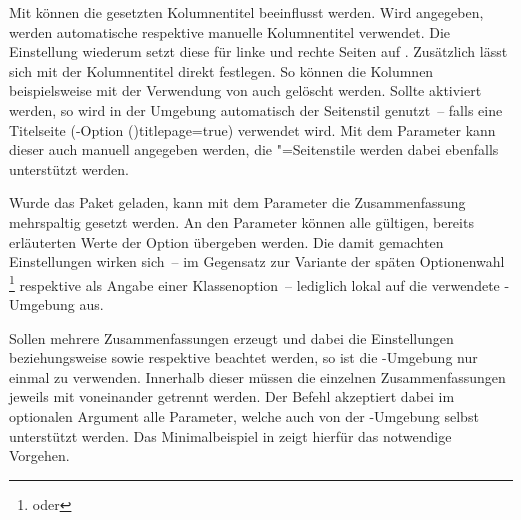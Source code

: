 \begin{DeclareEntity*}{}
\begin{DeclareEntity*}{}
\begin{DeclareEntity*}{}
\begin{Declaration}
\begin{Declaration}
\begin{Declaration}
\begin{Declaration}
\begin{Declaration}
\begin{Declaration}
\begin{Declaration}
%
%
Mit  können die gesetzten Kolumnentitel 
beeinflusst werden. Wird
angegeben, werden automatische respektive manuelle Kolumnentitel verwendet. 
Die Einstellung
wiederum setzt diese für linke und rechte Seiten auf . 
Zusätzlich lässt sich mit
der Kolumnentitel direkt festlegen. So können die Kolumnen beispielsweise mit 
der Verwendung von  auch 
gelöscht werden. Sollte  aktiviert 
werden, so wird in der Umgebung automatisch der Seitenstil  
genutzt~-- falls eine Titelseite
(\KOMAScript-Option \Option(){titlepage=true}) 
verwendet wird. Mit dem Parameter  kann 
dieser auch manuell angegeben werden, die "=Seitenstile 
werden dabei ebenfalls unterstützt werden.

%
Wurde das Paket  geladen, kann mit dem Parameter 
 die Zusammenfassung 
mehrspaltig gesetzt werden. An den Parameter  
können alle gültigen, bereits erläuterten Werte der Option  
übergeben werden. Die damit gemachten Einstellungen wirken sich~-- im Gegensatz 
zur Variante der späten Optionenwahl%
\footnote{%
   oder
}
respektive als Angabe einer Klassenoption~-- lediglich lokal auf die verwendete 
-Umgebung aus.

%
Sollen mehrere Zusammenfassungen erzeugt und dabei die Einstellungen 
 beziehungsweise  sowie 
 respektive  beachtet werden, so 
ist die -Umgebung nur einmal zu verwenden. Innerhalb 
dieser müssen die einzelnen Zusammenfassungen jeweils mit  
voneinander getrennt werden. Der Befehl akzeptiert dabei im optionalen Argument 
alle Parameter, welche auch von der -Umgebung selbst 
unterstützt werden. Das Minimalbeispiel in  
zeigt hierfür das notwendige Vorgehen.


\end{Declaration}
\end{Declaration}
\end{Declaration}
\end{Declaration}
\end{Declaration}
\end{Declaration}
\end{Declaration}
\end{DeclareEntity*}
\end{DeclareEntity*}
\end{DeclareEntity*}
